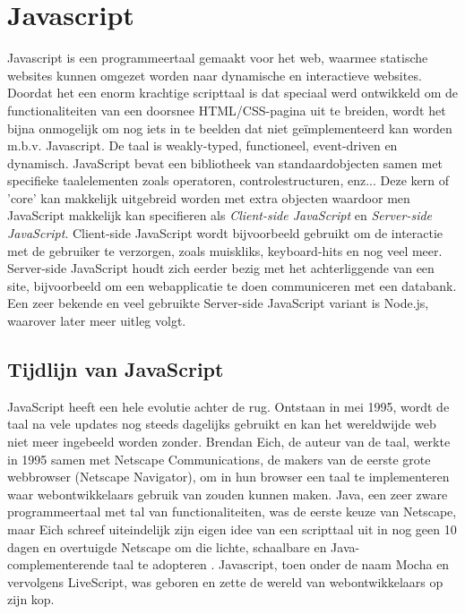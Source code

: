 \section{Javascript}
\label{sec:javascript}

Javascript is een programmeertaal gemaakt voor het web, waarmee statische websites kunnen omgezet worden naar dynamische en interactieve websites. Doordat het een enorm krachtige scripttaal is dat speciaal werd ontwikkeld om de functionaliteiten van een doorsnee HTML/CSS-pagina uit te breiden, wordt het bijna onmogelijk om nog iets in te beelden dat niet geïmplementeerd kan worden m.b.v. Javascript. De taal is weakly-typed, functioneel, event-driven en dynamisch. JavaScript bevat een bibliotheek van standaardobjecten samen met specifieke taalelementen zoals operatoren, controlestructuren, enz... Deze kern of 'core' kan makkelijk uitgebreid worden met extra objecten waardoor men JavaScript makkelijk kan specifieren als \textit{Client-side JavaScript} en \textit{Server-side JavaScript}. Client-side JavaScript wordt bijvoorbeeld gebruikt om de interactie met de gebruiker te verzorgen, zoals muiskliks, keyboard-hits en nog veel meer. Server-side JavaScript houdt zich eerder bezig met het achterliggende van een site, bijvoorbeeld om een webapplicatie te doen communiceren met een databank. Een zeer bekende en veel gebruikte Server-side JavaScript variant is Node.js, waarover later meer uitleg volgt. \autocite{Javascript2019}

\subsection{Tijdlijn van JavaScript}
\label{sec:jsTimeline}

JavaScript heeft een hele evolutie achter de rug. Ontstaan in mei 1995, wordt de taal na vele updates nog steeds dagelijks gebruikt en kan het wereldwijde web niet meer ingebeeld worden zonder. Brendan Eich, de auteur van de taal, werkte in 1995 samen met Netscape Communications, de makers van de eerste grote webbrowser (Netscape Navigator), om in hun browser een taal te implementeren waar webontwikkelaars gebruik van zouden kunnen maken. Java, een zeer zware programmeertaal met tal van functionaliteiten, was de eerste keuze van Netscape, maar Eich schreef uiteindelijk zijn eigen idee van een scripttaal uit in nog geen 10 dagen en overtuigde Netscape om die lichte, schaalbare en Java-complementerende taal te adopteren \autocite{Rangpariya2019}. Javascript, toen onder de naam Mocha en vervolgens LiveScript, was geboren en zette de wereld van webontwikkelaars op zijn kop.


